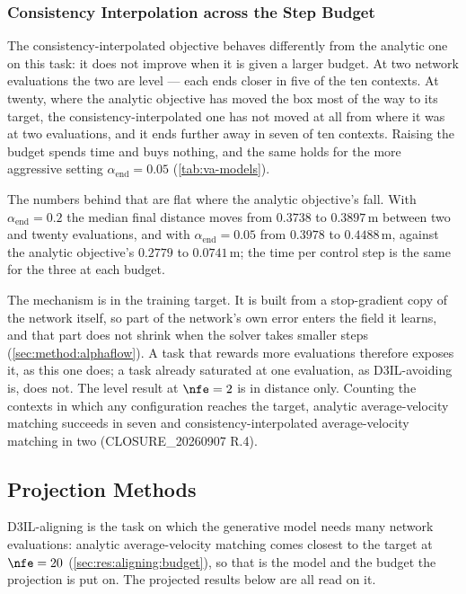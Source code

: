 \subsubsection{Consistency Interpolation across the Step Budget}\label{sec:res:aligning:consistency}

The consistency-interpolated objective behaves differently from the analytic one on this task: it does
not improve when it is given a larger budget. At two network evaluations the two are level --- each ends
closer in five of the ten contexts. At twenty, where the analytic objective has moved the box most of the
way to its target, the consistency-interpolated one has not moved at all from where it was at two
evaluations, and it ends further away in seven of ten contexts. Raising the budget spends time and buys
nothing, and the same holds for the more aggressive setting $\alpha_{\mathrm{end}}=0.05$
(\autoref{tab:va-models}).

The numbers behind that are flat where the analytic objective's fall. With
$\alpha_{\mathrm{end}}=0.2$ the median final distance moves from $0.3738$ to $0.3897$\,m between two and
twenty evaluations, and with $\alpha_{\mathrm{end}}=0.05$ from $0.3978$ to $0.4488$\,m, against the analytic
objective's $0.2779$ to $0.0741$\,m; the time per control step is the same for the three at each budget.

The mechanism is in the training target. It is built from a stop-gradient copy of the network itself, so
part of the network's own error enters the field it learns, and that part does not shrink when the solver
takes smaller steps (\autoref{sec:method:alphaflow}). A task that rewards more evaluations therefore
exposes it, as this one does; a task already saturated at one evaluation, as D3IL-avoiding is, does not.
The level result at $\nfe=2$ is in distance only. Counting the contexts in which any
configuration reaches the target, analytic average-velocity matching succeeds in seven and
consistency-interpolated average-velocity matching in two (CLOSURE\_20260907 R.4).

\subsection{Projection Methods}\label{sec:res:aligning:projection}

D3IL-aligning is the task on which the generative model needs many network evaluations: analytic
average-velocity matching comes closest to the target at $\nfe=20$ (\autoref{sec:res:aligning:budget}),
so that is the model and the budget the projection is put on. The projected results below are all read
on it.

